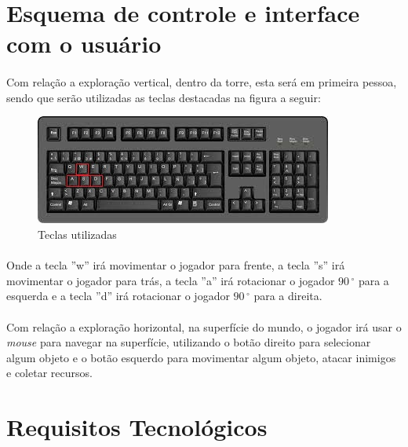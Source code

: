 \documentclass[11pt]{article} %
\begin{document}
\section{Esquema de controle e interface com o usuário}

\paragraph{}Com relação a exploração vertical, dentro da torre, esta será em primeira pessoa, sendo que serão utilizadas as teclas destacadas na figura a seguir:\\

\begin{figure}[!htp]
\centering
\includegraphics[scale=0.75]{pictures/teclado.jpg}
\caption{Teclas utilizadas}
\label{Teclado}
\end{figure}

\paragraph{}Onde a tecla ''w'' irá movimentar o jogador para frente, a tecla ''s'' irá movimentar o jogador para trás, a tecla ''a'' irá rotacionar o jogador $90\,^{\circ}$ para a esquerda e a tecla ''d'' irá rotacionar o jogador $90\,^{\circ}$ para a direita.

\paragraph{}Com relação a exploração horizontal, na superfície do mundo, o jogador irá usar o \textit{mouse} para navegar na superfície, utilizando o botão direito para selecionar algum objeto e o botão esquerdo para movimentar algum objeto, atacar inimigos e coletar recursos.

\section{Requisitos Tecnológicos}
\end{document}
